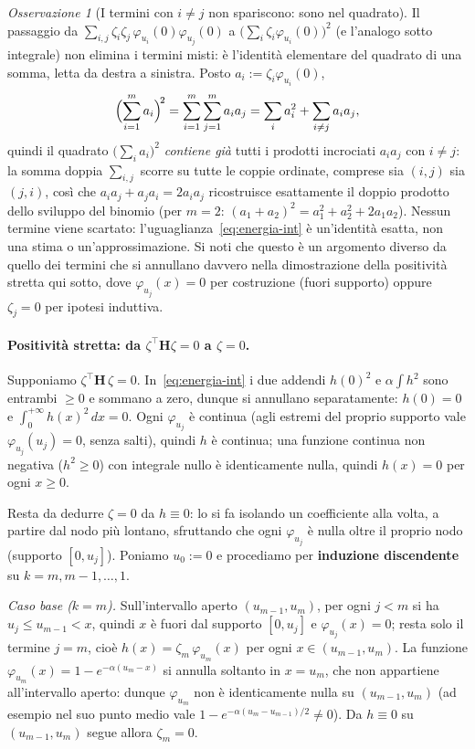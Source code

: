 \documentclass[11pt,a4paper]{article}
\theoremstyle{plain}
\theoremstyle{definition}
\theoremstyle{remark}
\newtheorem*{osservazione}{Osservazione}
\newcommand{\Hmat}{\mathbf{H}}
\newcommand{\transp}{^{\!\top}}
\begin{document}
\begin{osservazione}[I termini con $i\neq j$ non spariscono: sono nel quadrato]
Il passaggio da $\sum_{i,j}\zeta_i\zeta_j\,\varphi_{u_i}(0)\varphi_{u_j}(0)$ a
$\bigl(\sum_i\zeta_i\varphi_{u_i}(0)\bigr)^2$ (e l'analogo sotto integrale) non elimina i
termini misti: \`e l'identit\`a elementare del quadrato di una somma, letta da destra a
sinistra. Posto $a_i:=\zeta_i\varphi_{u_i}(0)$,
\[
  \Bigl(\sum_{i=1}^m a_i\Bigr)^{\!2} = \sum_{i=1}^m\sum_{j=1}^m a_i a_j
  = \sum_i a_i^2 + \sum_{i\neq j} a_i a_j ,
\]
quindi il quadrato $\bigl(\sum_i a_i\bigr)^2$ \emph{contiene gi\`a} tutti i prodotti incrociati
$a_ia_j$ con $i\neq j$: la somma doppia $\sum_{i,j}$ scorre su tutte le coppie ordinate,
comprese sia $(i,j)$ sia $(j,i)$, cos\`i che $a_ia_j+a_ja_i=2a_ia_j$ ricostruisce esattamente
il doppio prodotto dello sviluppo del binomio (per $m=2$: $(a_1+a_2)^2=a_1^2+a_2^2+2a_1a_2$).
Nessun termine viene scartato: l'uguaglianza~\eqref{eq:energia-int} \`e un'identit\`a esatta,
non una stima o un'approssimazione. Si noti che questo \`e un argomento diverso da quello dei
termini che si annullano davvero nella dimostrazione della positivit\`a stretta qui sotto, dove
$\varphi_{u_j}(x)=0$ per costruzione (fuori supporto) oppure $\zeta_j=0$ per ipotesi induttiva.
\end{osservazione}

\paragraph{Positivit\`a stretta: da $\zeta\transp\Hmat\zeta=0$ a $\zeta=0$.} Supponiamo
$\zeta\transp\Hmat\,\zeta=0$. In~\eqref{eq:energia-int} i due addendi $h(0)^2$ e
$\alpha\int h^2$ sono entrambi $\ge 0$ e sommano a zero, dunque si annullano separatamente:
$h(0)=0$ e $\int_0^{+\infty}h(x)^2\,dx=0$. Ogni $\varphi_{u_j}$ \`e continua (agli estremi del
proprio supporto vale $\varphi_{u_j}(u_j)=0$, senza salti), quindi $h$ \`e continua; una
funzione continua non negativa ($h^2\ge0$) con integrale nullo \`e identicamente nulla, quindi
$h(x)=0$ per ogni $x\ge 0$.

Resta da dedurre $\zeta=0$ da $h\equiv 0$: lo si fa isolando un coefficiente alla volta, a
partire dal nodo pi\`u lontano, sfruttando che ogni $\varphi_{u_j}$ \`e nulla oltre il proprio
nodo (supporto $[0,u_j]$). Poniamo $u_0:=0$ e procediamo per \textbf{induzione discendente}
su $k=m,m-1,\ldots,1$.

\emph{Caso base ($k=m$).} Sull'intervallo aperto $(u_{m-1},u_m)$, per ogni $j<m$ si ha
$u_j\le u_{m-1}<x$, quindi $x$ \`e fuori dal supporto $[0,u_j]$ e $\varphi_{u_j}(x)=0$; resta
solo il termine $j=m$, cio\`e $h(x)=\zeta_m\,\varphi_{u_m}(x)$ per ogni $x\in(u_{m-1},u_m)$.
La funzione $\varphi_{u_m}(x)=1-e^{-\alpha(u_m-x)}$ si annulla soltanto in $x=u_m$, che non
appartiene all'intervallo aperto: dunque $\varphi_{u_m}$ non \`e identicamente nulla su
$(u_{m-1},u_m)$ (ad esempio nel suo punto medio vale $1-e^{-\alpha(u_m-u_{m-1})/2}\neq0$). Da
$h\equiv 0$ su $(u_{m-1},u_m)$ segue allora $\zeta_m=0$.
\end{document}

